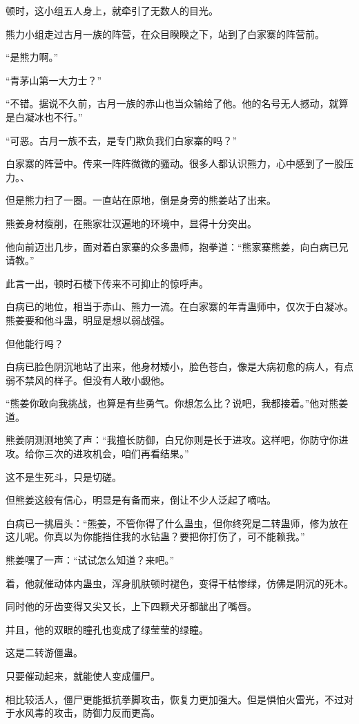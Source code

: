 \begin{this_body}
顿时，这小组五人身上，就牵引了无数人的目光。

熊力小组走过古月一族的阵营，在众目睽睽之下，站到了白家寨的阵营前。

“是熊力啊。”

“青茅山第一大力士？”

“不错。据说不久前，古月一族的赤山也当众输给了他。他的名号无人撼动，就算是白凝冰也不行。”

“可恶。古月一族不去，是专门欺负我们白家寨的吗？”

白家寨的阵营中。传来一阵阵微微的骚动。很多人都认识熊力，心中感到了一股压力。、

但是熊力扫了一圈。一直站在原地，倒是身旁的熊姜站了出来。

熊姜身材瘦削，在熊家壮汉遍地的环境中，显得十分突出。

他向前迈出几步，面对着白家寨的众多蛊师，抱拳道：“熊家寨熊姜，向白病已兄请教。”

此言一出，顿时石楼下传来不可抑止的惊呼声。

白病已的地位，相当于赤山、熊力一流。在白家寨的年青蛊师中，仅次于白凝冰。熊姜要和他斗蛊，明显是想以弱战强。

但他能行吗？

白病已脸色阴沉地站了出来，他身材矮小，脸色苍白，像是大病初愈的病人，有点弱不禁风的样子。但没有人敢小觑他。

“熊姜你敢向我挑战，也算是有些勇气。你想怎么比？说吧，我都接着。”他对熊姜道。

熊姜阴测测地笑了声：“我擅长防御，白兄你则是长于进攻。这样吧，你防守你进攻。给你三次的进攻机会，咱们再看结果。”

这不是生死斗，只是切磋。

但熊姜这般有信心，明显是有备而来，倒让不少人泛起了嘀咕。

白病已一挑眉头：“熊姜，不管你得了什么蛊虫，但你终究是二转蛊师，修为放在这儿呢。你真以为你能挡住我的水钻蛊？要把你打伤了，可不能赖我。”

熊姜嘿了一声：“试试怎么知道？来吧。”

着，他就催动体内蛊虫，浑身肌肤顿时褪色，变得干枯惨绿，仿佛是阴沉的死木。

同时他的牙齿变得又尖又长，上下四颗犬牙都龇出了嘴唇。

并且，他的双眼的瞳孔也变成了绿莹莹的绿瞳。

这是二转游僵蛊。

只要催动起来，就能使人变成僵尸。

相比较活人，僵尸更能抵抗拳脚攻击，恢复力更加强大。但是惧怕火雷光，不过对于水风毒的攻击，防御力反而更高。


\end{this_body}
